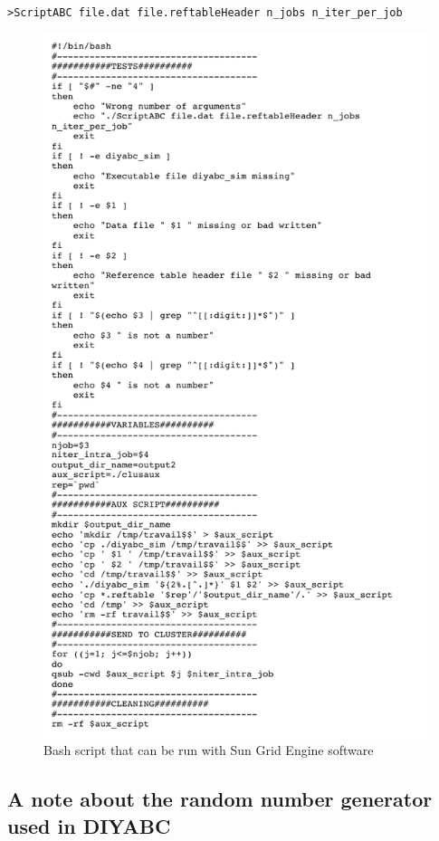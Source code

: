   \texttt{>ScriptABC file.dat file.reftableHeader n\_jobs n\_iter\_per\_job}
\clearpage
\begin{figure}
\caption{Bash script that can be run with Sun Grid Engine software}
\includegraphics{gui_pictures/script_SGE.pdf}
\end{figure}

\clearpage
\subsection{A note about the random number generator used in DIYABC}

